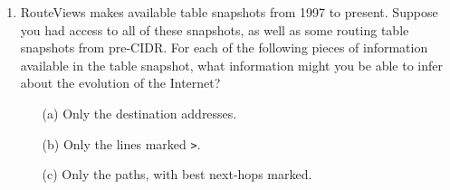\documentclass[11pt]{article}
\begin{document}
\begin{enumerate}

\item RouteViews makes available table snapshots from 1997 to present.
  Suppose you had access to all of these snapshots, as well as some
  routing table snapshots from pre-CIDR.  For each of the following
  pieces of information available in the table snapshot, what
  information might you be able to infer about the evolution of the
  Internet?
\begin{itemize}
\item[(a)]  Only the destination addresses.
\item[(b)]  Only the lines marked {\tt *>}.
\item[(c)]  Only the paths, with best next-hops marked.
\end{itemize}

\end{enumerate}
\fi
\end{document}
